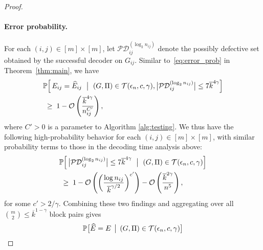 \documentclass[journal]{IEEEtran}
\theoremstyle{definition}
\theoremstyle{definition}
\newcommand{\Tc}{\mathcal{T}}
\newcommand{\PP}{\mathbb{P}}
\newcommand{\kb}{\overline{k}}
\newcommand{\bigO}{\mathcal{O}}
\begin{document}
\begin{proof}
\paragraph{Error probability.}
For each $(i,j) \in [m]\times[m]$, let $\mathcal{PD}_{ij}^{(\log_2 n_{ij})}$ denote the possibly defective set obtained by the successful decoder on $G_{ij}$. 
Similar to~\eqref{eq:error_prob} in Theorem~\ref{thm:main}, we have
\begin{align*}
    &\PP \Big[\, E_{ij} = \widehat{E}_{ij}\ \bigm|\ 
       (G,\Pi) \in \Tc(\epsilon_n,c,\gamma), \big|\mathcal{PD}_{ij}^{(\log_2 n_{ij})}\big| 
       \le 7\kb^{4\gamma} \Big] \\
    &\;\ge\; 1 - \bigO \left( \frac{\kb^{4\gamma}}{n_{ij}^{C'}} \right),
\end{align*}
where $C' > 0$ is a parameter to Algorithm \ref{alg:testing}. 
We thus have the following high-probability behavior for each $(i,j) \in [m]\times[m]$, with similar probability terms to those in the decoding time analysis above: 
\begin{align*}
    &\PP \Big[\, \big|\mathcal{PD}_{ij}^{(\log_2 n_{ij})}\big| 
       \le 7\kb^{4\gamma}\ \bigm|\ 
       (G,\Pi) \in \Tc(\epsilon_n,c,\gamma) \Big] \\
    &\;\ge\; 1 
       - \bigO \left(\left(\frac{\log n_{ij}}{\kb^{\gamma/2}}\right)^{c'}\right) 
       - \bigO \left( \frac{\kb^{2\gamma}}{n^5} \right),
\end{align*}
for some $c' > 2/\gamma$. 
Combining these two findings and aggregating over all $\binom{m}{2} \le \kb^{1-\gamma}$ block pairs gives
\begin{align*}
    &\PP \big[\widehat{E} = E \,\bigm|\,
       (G,\Pi) \in \Tc(\epsilon_n,c,\gamma)\big] \\

\end{align*}
\end{proof}
\end{document}
